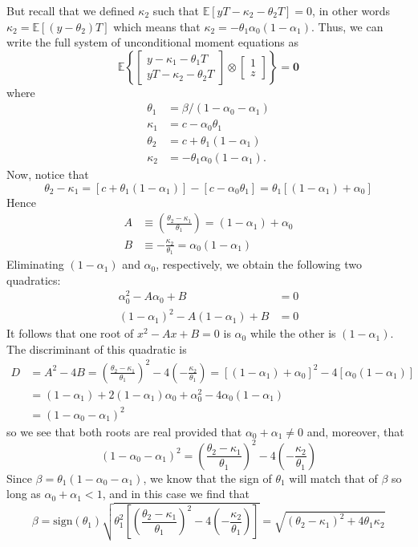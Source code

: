 \documentclass[12pt]{article}
\begin{document}
But recall that we defined $\kappa_2$ such that $\mathbb{E}[yT - \kappa_2 - \theta_2 T] = 0$, in other words $\kappa_2 = \mathbb{E}[(y - \theta_2)T]$ which means that $\kappa_2 = -\theta_1 \alpha_0(1 - \alpha_1)$.
Thus, we can write the full system of unconditional moment equations as
\[
  \mathbb{E}\left\{ \left[
    \begin{array}{c}
    y - \kappa_1 - \theta_1 T \\ 
    yT - \kappa_2 - \theta_2 T
  \end{array}
\right]\otimes
\left[
\begin{array}{cc}
1 \\ z
\end{array}
\right]\right\} = \mathbf{0}
\]
where
\begin{align*}
  \theta_1 &= \beta / (1 - \alpha_0 - \alpha_1) \\
  \kappa_1 &= c - \alpha_0 \theta_1\\
  \theta_2 &= c + \theta_1 (1 - \alpha_1)\\
  \kappa_2 &= -\theta_1 \alpha_0 (1 - \alpha_1).
\end{align*}
Now, notice that
\[
  \theta_2 - \kappa_1 = \left[ c + \theta_1 (1 - \alpha_1) \right] - \left[ c - \alpha_0 \theta_1 \right] = \theta_1 \left[ (1 - \alpha_1) + \alpha_0 \right]
\]
Hence
\begin{align}
  \label{eq:IdentExog1}
  A &\equiv \left(\frac{\theta_2 - \kappa_1}{\theta_1}\right) = (1 - \alpha_1) + \alpha_0\\
  B &\equiv -\frac{\kappa_2}{\theta_1} = \alpha_0 (1 - \alpha_1)
\end{align}
Eliminating $(1 - \alpha_1)$ and $\alpha_0$, respectively, we obtain the following two quadratics:
\begin{align}
  \alpha_0^2 - A \alpha_0 + B &= 0\\
  (1 - \alpha_1)^2 - A (1 - \alpha_1) + B &= 0
\end{align}
It follows that one root of $x^2 - Ax + B = 0$ is $\alpha_0$ while the other is $(1 - \alpha_1)$.
The discriminant of this quadratic is
\begin{align*}
  D &= A^2 - 4 B  = \left( \frac{\theta_2 - \kappa_1}{\theta_1} \right)^2 - 4 \left( -\frac{\kappa_2}{\theta_1} \right) = [(1 - \alpha_1) + \alpha_0]^2 - 4 [\alpha_0 (1 - \alpha_1)]\\
  &= (1 - \alpha_1) + 2(1 - \alpha_1)\alpha_0 + \alpha_0^2 - 4\alpha_0 (1 - \alpha_1)\\
  &= (1 - \alpha_0 - \alpha_1)^2
\end{align*}
so we see that both roots are real provided that $\alpha_0 + \alpha_1 \neq 0$ and, moreover, that
\[
  (1 - \alpha_0 - \alpha_1)^2 = \left( \frac{\theta_2 - \kappa_1}{\theta_1} \right)^2 - 4 \left( -\frac{\kappa_2}{\theta_1} \right)
\]
Since $\beta = \theta_1 (1 - \alpha_0 - \alpha_1)$, we know that the sign of $\theta_1$ will match that of $\beta$ so long as $\alpha_0 + \alpha_1 < 1$, and in this case we find that
\[
  \beta = \mbox{sign}(\theta_1) \sqrt{\theta_1^2\left[ \left( \frac{\theta_2 - \kappa_1}{\theta_1} \right)^2 - 4 \left( -\frac{\kappa_2}{\theta_1} \right)
 \right]} = \sqrt{(\theta_2 - \kappa_1)^2 + 4 \theta_1 \kappa_2}
\]
\end{document}
